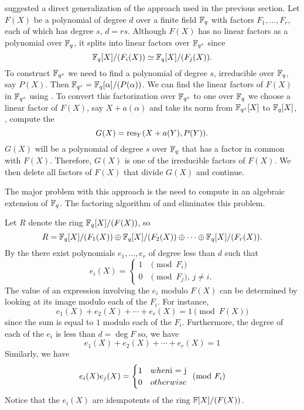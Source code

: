 {\Rabin} suggested a direct generalization of the approach used in the
previous section.  Let $F(X)$ be a polynomial of degree $d$ over a finite 
field $\mathbb{F}_q$ with factors $F_1, \ldots, F_r$, each of which has degree 
$s$, $d = rs$.  Although $F(X)$ has no linear factors as a polynomial over
$\mathbb{F}_q$, it splits into linear factors over $\mathbb{F}_{q^s}$ since 
\[
\mathbb{F}_q[X]/(F_i(X)) \simeq \mathbb{F}_q[X]/(F_j(X)).
\]
To construct $\mathbb{F}_{q^s}$ we need to find a polynomial of degree $s$,
irreducible over $\mathbb{F}_q$, say $P(X)$.  Then $\mathbb{F}_{q^s} =
\mathbb{F}_q[\alpha]/(P(\alpha))$.  We can find the linear factors of $F(X)$
in $\mathbb{F}_{q^s}$ using .  To convert this
factorization over $\mathbb{F}_{q^s}$ to one over $\mathbb{F}_q$ we choose a linear
factor of $F(X)$, say $X + a(\alpha)$ and take its norm
from $\mathbb{F}_{q^s}[X]$ to $\mathbb{F}_q[X]$, \ie, compute the 
\[
G(X) = \mathop{\rm res}\nolimits_Y(X + a(Y), P(Y)).
\]
$G(X)$ will be a polynomial of degree $s$ over $\mathbb{F}_q$ that has a
factor in common with $F(X)$.  Therefore, $G(X)$ is one of the
irreducible factors of $F(X)$.  We then delete all factors of $F(X)$
that divide $G(X)$ and continue.

The major problem with this approach is the need to compute in an
algebraic extension of $\mathbb{F}_q$.  The factoring algorithm of
{\CantorD} and {\Zassenhaus} \cite{Cantor81} eliminates this problem. 

Let $R$ denote the ring $\mathbb{F}_q[X]/(F(X))$, so
\[
R = \mathbb{F}_q[X]/(F_1(X)) \oplus \mathbb{F}_q[X]/(F_2(X)) \oplus \cdots \oplus
\mathbb{F}_q[X]/(F_r(X)).
\]
By the  there exist polynomials $e_1, \ldots,
e_r$ of degree less than $d$ such that
\begin{equation} \label{Wedd:Basis:Eq}
e_i(X) = 
\begin{cases}
1 & \text{$\pmod{F_i}$} \\
0 & \text{$\pmod{F_j}$, $j\not=i$.}
\end{cases}
\end{equation}
The value of an expression involving the $e_i$ modulo $F(X)$ can be
determined by looking at its image modulo each of the $F_i$.  For
instance, 
\[
e_1(X) + e_2(X) + \cdots + e_r(X) = 1 \pmod{F(X)}
\]
since the sum is equal to $1$ modulo each of the $F_i$.  Furthermore,
the degree of each of the $e_i$ is less than $d = \deg F$ so, we have
\begin{equation} \label{Wedd:Split:Eq}
e_1(X) + e_2(X) + \cdots + e_r(X) = 1
\end{equation}
Similarly, we have
\[
e_i(X) e_j(X) = 
\begin{cases}
1 & when $i = j$ \\
0 & otherwise
\end{cases} \pmod{F_i}
\]
Notice that the $e_i(X)$ are idempotents of the ring $\mathbb{F}[X]/(F(X))$.

